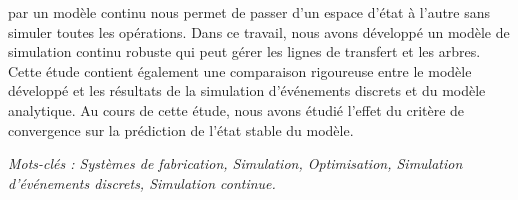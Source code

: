 par un modèle continu nous permet de passer d'un espace d'état à l'autre sans simuler toutes les opérations. 
Dans ce travail, nous avons développé un modèle de simulation continu robuste qui peut gérer les lignes de 
transfert et les arbres. Cette étude contient également une comparaison rigoureuse entre le modèle développé 
et les résultats de la simulation d'événements discrets et du modèle analytique. Au cours de cette étude, 
nous avons étudié l'effet du critère de convergence sur la prédiction de l'état stable du modèle.\par
\vspace{5pt}
\textit{Mots-clés : Systèmes de fabrication, Simulation, Optimisation, Simulation d'événements discrets, Simulation continue.}

